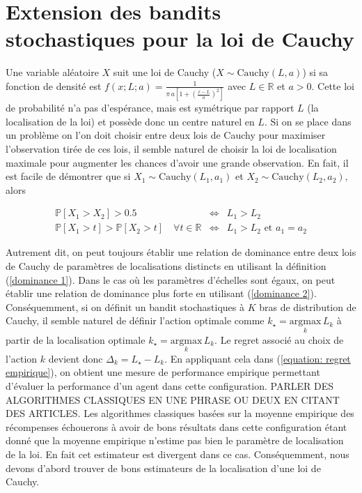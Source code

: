 \documentclass{article}
\renewcommand{\P}[1]{\mathbb{P}\left[ #1 \right]}
\begin{document}
\section{Extension des bandits stochastiques pour la loi de Cauchy}
Une variable aléatoire $X$ suit une loi de Cauchy ($X\sim\mathrm{Cauchy}(L,a)$) si sa fonction de densité est \mbox{$f(x;L;a)=\frac{1}{\pi\,a\left[1+\left(\frac{x-L}{a}\right)^2\right]}$} avec $L\in\mathbb{R}$ et $a>0.$ Cette loi de probabilité n'a pas d'espérance, mais est symétrique par rapport $L$ (la localisation de la loi) et possède donc un centre naturel en $L.$ Si on se place dans un problème on l'on doit choisir entre deux lois de Cauchy pour maximiser l'observation tirée de ces lois, il semble naturel de choisir la loi de localisation maximale pour augmenter les chances d'avoir une grande observation. En fait, il est facile de démontrer que si $X_1\sim\mathrm{Cauchy}(L_1,a_1)$ et $X_2\sim\mathrm{Cauchy}(L_2,a_2),$ alors 

\begin{eqnarray}
\P{X_1>X_2}>0.5 &\Leftrightarrow& L_1>L_2 \label{dominance 1}\\
\P{X_1>t}>\P{X_2>t} \quad \forall t\in \mathbb R &\Leftrightarrow& L_1>L_2 \text{ et } a_1=a_2 \label{dominance 2}
\end{eqnarray} 

Autrement dit, on peut toujours établir une relation de dominance entre deux lois de Cauchy de paramètres de localisations distincts en utilisant la définition (\ref{dominance 1}). Dans le cas où les paramètres d'échelles sont égaux, on peut établir une relation de dominance plus forte en utilisant (\ref{dominance 2}). Conséquemment, si on définit un bandit stochastiques à $K$ bras de distribution de Cauchy, il semble naturel de définir l'action optimale comme $k_{\star} = \underset{k}{\mathrm{argmax}}\,L_k$ à partir de la localisation optimale $k_{\star} = \underset{k}{\mathrm{argmax}}\,L_k.$ Le regret associé au choix de l'action $k$ devient donc $\Delta_k= L_{\star}-L_k.$ En appliquant cela dans (\ref{equation: regret empirique}), on obtient une mesure de performance empirique permettant d'évaluer la performance d'un agent dans cette configuration.
PARLER DES ALGORITHMES CLASSIQUES EN UNE PHRASE OU DEUX EN CITANT DES ARTICLES.
Les algorithmes classiques basées sur la moyenne empirique des récompenses échouerons à avoir de bons résultats dans cette configuration étant donné que la moyenne empirique n'estime pas bien le paramètre de localisation de la loi. En fait cet estimateur est divergent dans ce cas. Conséquemment, nous devons d'abord trouver de bons estimateurs de la localisation d'une loi de Cauchy.  
\end{document}
